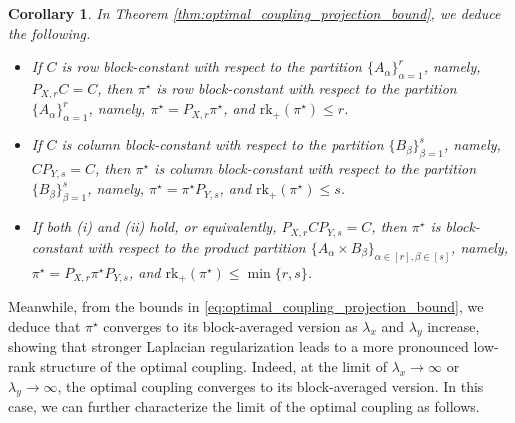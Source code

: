\documentclass{article}
\newtheorem{corollary}{Corollary}
\theoremstyle{definition}
\begin{document}
\begin{corollary}
    In Theorem \ref{thm:optimal_coupling_projection_bound}, we deduce the following.
    \begin{itemize}
        \item[(i)] If $C$ is row block-constant with respect to the partition $\{A_\alpha\}_{\alpha = 1}^{r}$, namely, $P_{X, r} C = C$, then $\pi^\star$ is row block-constant with respect to the partition $\{A_\alpha\}_{\alpha = 1}^{r}$, namely, $\pi^\star = P_{X, r} \pi^\star$, and $\mathrm{rk}_+(\pi^\star) \le r$.
        \item[(ii)] If $C$ is column block-constant with respect to the partition $\{B_\beta\}_{\beta = 1}^{s}$, namely, $C P_{Y, s} = C$, then $\pi^\star$ is column block-constant with respect to the partition $\{B_\beta\}_{\beta = 1}^{s}$, namely, $\pi^\star = \pi^\star P_{Y, s}$, and $\mathrm{rk}_+(\pi^\star) \le s$.
        \item[(iii)] If both (i) and (ii) hold, or equivalently, $P_{X, r} C P_{Y, s} = C$, then $\pi^\star$ is block-constant with respect to the product partition $\{A_\alpha \times B_\beta\}_{\alpha \in [r], \beta \in [s]}$, namely, $\pi^\star = P_{X, r} \pi^\star P_{Y, s}$, and $\mathrm{rk}_+(\pi^\star) \le \min\{r, s\}$.
    \end{itemize}
\end{corollary}

Meanwhile, from the bounds in \eqref{eq:optimal_coupling_projection_bound}, we deduce that $\pi^\star$ converges to its block-averaged version as $\lambda_x$ and $\lambda_y$ increase, showing that stronger Laplacian regularization leads to a more pronounced low-rank structure of the optimal coupling. Indeed, at the limit of $\lambda_x \to \infty$ or $\lambda_y \to \infty$, the optimal coupling converges to its block-averaged version. In this case, we can further characterize the limit of the optimal coupling as follows.
\end{document}
